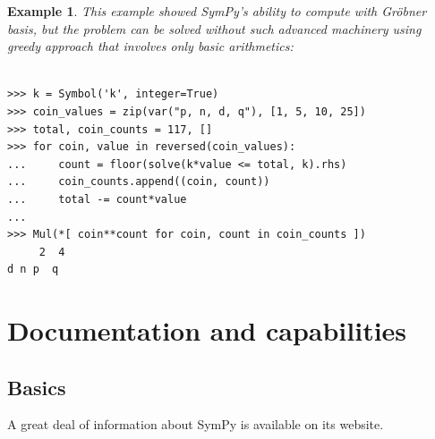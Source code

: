 \documentclass[12pt]{article}
\newtheorem{example}[theorem]{Example}
\begin{document}
\begin{example}
{This example showed SymPy's ability to compute with Gr\"obner basis, but the
problem can be solved without such advanced machinery using greedy approach
that involves only basic arithmetics:

\begin{Verbatim}[fontsize=\scriptsize,fontfamily=courier,fontshape=tt,frame=single,label=SymPy]

>>> k = Symbol('k', integer=True)
>>> coin_values = zip(var("p, n, d, q"), [1, 5, 10, 25])
>>> total, coin_counts = 117, []
>>> for coin, value in reversed(coin_values):
...     count = floor(solve(k*value <= total, k).rhs)
...     coin_counts.append((coin, count))
...     total -= count*value
...
>>> Mul(*[ coin**count for coin, count in coin_counts ])
     2  4
d n p  q

\end{Verbatim}

}
\end{example}




\section{Documentation and capabilities}



\subsection{Basics}

A great deal of information about SymPy is available on its website. 
\end{document}

